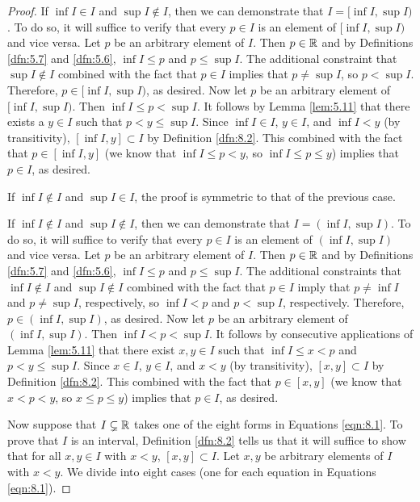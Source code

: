 \documentclass[../main.tex]{subfiles}
\begin{document}
\begin{lemma}
\begin{proof}
        If $\inf I\in I$ and $\sup I\notin I$, then we can demonstrate that $I=[\inf I,\sup I)$. To do so, it will suffice to verify that every $p\in I$ is an element of $[\inf I,\sup I)$ and vice versa. Let $p$ be an arbitrary element of $I$. Then $p\in\mathbb{R}$ and by Definitions \ref{dfn:5.7} and \ref{dfn:5.6}, $\inf I\leq p$ and $p\leq \sup I$. The additional constraint that $\sup I\notin I$ combined with the fact that $p\in I$ implies that $p\neq\sup I$, so $p<\sup I$. Therefore, $p\in[\inf I,\sup I)$, as desired. Now let $p$ be an arbitrary element of $[\inf I,\sup I)$. Then $\inf I\leq p<\sup I$. It follows by Lemma \ref{lem:5.11} that there exists a $y\in I$ such that $p<y\leq\sup I$. Since $\inf I\in I$, $y\in I$, and $\inf I<y$ (by transitivity), $[\inf I,y]\subset I$ by Definition \ref{dfn:8.2}. This combined with the fact that $p\in[\inf I,y]$ (we know that $\inf I\leq p<y$, so $\inf I\leq p\leq y$) implies that $p\in I$, as desired.\par
        If $\inf I\notin I$ and $\sup I\in I$, the proof is symmetric to that of the previous case.\par
        If $\inf I\notin I$ and $\sup I\notin I$, then we can demonstrate that $I=(\inf I,\sup I)$. To do so, it will suffice to verify that every $p\in I$ is an element of $(\inf I,\sup I)$ and vice versa. Let $p$ be an arbitrary element of $I$. Then $p\in\mathbb{R}$ and by Definitions \ref{dfn:5.7} and \ref{dfn:5.6}, $\inf I\leq p$ and $p\leq \sup I$. The additional constraints that $\inf I\notin I$ and $\sup I\notin I$ combined with the fact that $p\in I$ imply that $p\neq\inf I$ and $p\neq\sup I$, respectively, so $\inf I<p$ and $p<\sup I$, respectively. Therefore, $p\in(\inf I,\sup I)$, as desired. Now let $p$ be an arbitrary element of $(\inf I,\sup I)$. Then $\inf I<p<\sup I$. It follows by consecutive applications of Lemma \ref{lem:5.11} that there exist $x,y\in I$ such that $\inf I\leq x<p$ and $p<y\leq\sup I$. Since $x\in I$, $y\in I$, and $x<y$ (by transitivity), $[x,y]\subset I$ by Definition \ref{dfn:8.2}. This combined with the fact that $p\in[x,y]$ (we know that $x<p<y$, so $x\leq p\leq y$) implies that $p\in I$, as desired.\par\bigskip
        Now suppose that $I\subsetneq\mathbb{R}$ takes one of the eight forms in Equations \ref{eqn:8.1}. To prove that $I$ is an interval, Definition \ref{dfn:8.2} tells us that it will suffice to show that for all $x,y\in I$ with $x<y$, $[x,y]\subset I$. Let $x,y$ be arbitrary elements of $I$ with $x<y$. We divide into eight cases (one for each equation in Equations \ref{eqn:8.1}).\par\smallskip

\end{proof}
\end{lemma}
\end{document}
